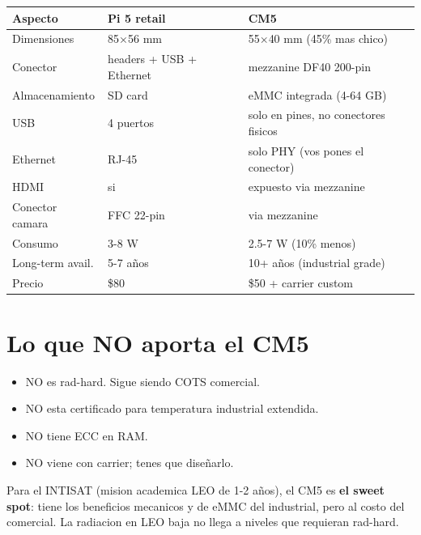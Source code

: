 \documentclass[11pt,a4paper,oneside,openright]{book}
\begin{document}
\begin{center}
\begin{tabular}{p{4cm}p{5cm}p{5.5cm}}
\toprule
\textbf{Aspecto} & \textbf{Pi 5 retail} & \textbf{CM5} \\
\midrule
Dimensiones        & 85$\times$56 mm    & 55$\times$40 mm (45\% mas chico) \\
Conector           & headers + USB + Ethernet & mezzanine DF40 200-pin \\
Almacenamiento     & SD card            & eMMC integrada (4-64 GB) \\
USB                & 4 puertos          & solo en pines, no conectores fisicos \\
Ethernet           & RJ-45              & solo PHY (vos pones el conector) \\
HDMI               & si                 & expuesto via mezzanine \\
Conector camara    & FFC 22-pin         & via mezzanine \\
Consumo            & 3-8 W              & 2.5-7 W (10\% menos) \\
Long-term avail.   & 5-7 años           & 10+ años (industrial grade) \\
Precio             & \$80                & \$50 + carrier custom \\
\bottomrule
\end{tabular}
\end{center}

\section{Lo que NO aporta el CM5}

\begin{itemize}[leftmargin=2em]
  \item NO es rad-hard. Sigue siendo COTS comercial.
  \item NO esta certificado para temperatura industrial extendida.
  \item NO tiene ECC en RAM.
  \item NO viene con carrier; tenes que diseñarlo.
\end{itemize}

\begin{payload}
Para el INTISAT (mision academica LEO de 1-2 años), el CM5 es \textbf{el
sweet spot}: tiene los beneficios mecanicos y de eMMC del industrial,
pero al costo del comercial. La radiacion en LEO baja no llega a niveles
que requieran rad-hard.
\end{payload}
\end{document}

